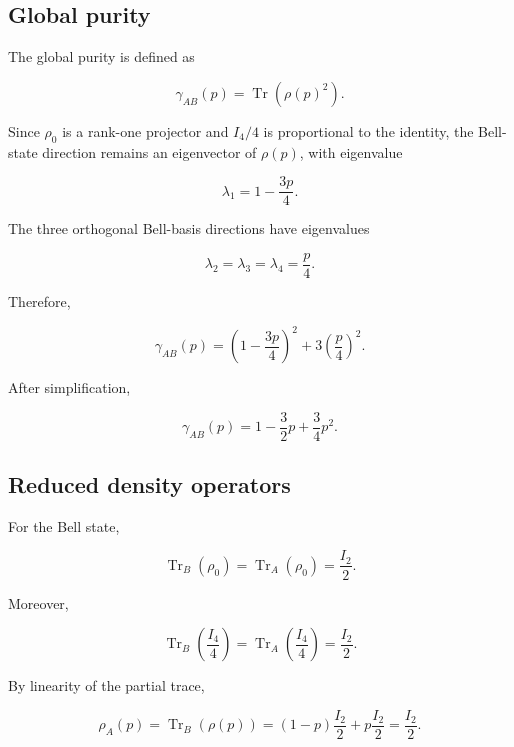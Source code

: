 
\subsection*{Global purity}

The global purity is defined as

\[
\gamma_{AB}(p)
=
\operatorname{Tr}
\left(
\rho(p)^2
\right).
\]

Since \( \rho_0 \) is a rank-one projector and \( I_4/4 \) is proportional to the identity, the Bell-state direction remains an eigenvector of \( \rho(p) \), with eigenvalue

\[
\lambda_1
=
1-\frac{3p}{4}.
\]

The three orthogonal Bell-basis directions have eigenvalues

\[
\lambda_2
=
\lambda_3
=
\lambda_4
=
\frac{p}{4}.
\]

Therefore,

\[
\gamma_{AB}(p)
=
\left(
1-\frac{3p}{4}
\right)^2
+
3
\left(
\frac{p}{4}
\right)^2.
\]

After simplification,

\begin{equation}
\gamma_{AB}(p)
=
1
-
\frac{3}{2}p
+
\frac{3}{4}p^2.
\label{eq:appendix_depolarizing_global_purity}
\end{equation}


\subsection*{Reduced density operators}

For the Bell state,

\[
\operatorname{Tr}_B(\rho_0)
=
\operatorname{Tr}_A(\rho_0)
=
\frac{I_2}{2}.
\]

Moreover,

\[
\operatorname{Tr}_B
\left(
\frac{I_4}{4}
\right)
=
\operatorname{Tr}_A
\left(
\frac{I_4}{4}
\right)
=
\frac{I_2}{2}.
\]

By linearity of the partial trace,

\[
\rho_A(p)
=
\operatorname{Tr}_B(\rho(p))
=
(1-p)\frac{I_2}{2}
+
p\frac{I_2}{2}
=
\frac{I_2}{2}.
\]

